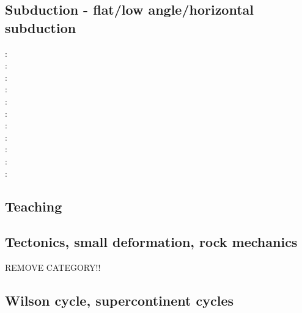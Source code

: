 \subsection{Subduction - flat/low angle/horizontal subduction}

\begin{scriptsize}
\twothousand: \cite{vavv00}\\
\twothousandone: \cite{vavv01}\\
\twothousandtwo: \cite{vavv02}\cite{vavv02b}\\
\twothousandfour: \cite{vavv04d}\\
\twothousandeight: \cite{pekh08}\cite{esfm08}\\
\twothousandeleven: \cite{cube11}\\
\twothousandtwelve: \cite{mapm12}\cite{ronb12}\\
\twothousandfifteen: \cite{gehm15}\cite{tarn15}\cite{ealw15}\\
\twothousandsixteen: \cite{chdf16}\cite{huwc16}\cite{hulh16}\\
\twothousandnineteen: \cite{sifg19}\cite{sams19b}\cite{malg19}\\
\twothousandtwenty: \cite{dawl20}
\end{scriptsize}

\subsection{Teaching} 

\begin{scriptsize}
\cite{grap11}
\cite{kerh14}
\cite{bemg19}
\end{scriptsize}

\subsection{Tectonics, small deformation, rock mechanics}
REMOVE CATEGORY!!
{\scriptsize
\cite{ilma93}
\cite{hept96}
}

\subsection{Wilson cycle, supercontinent cycles}

